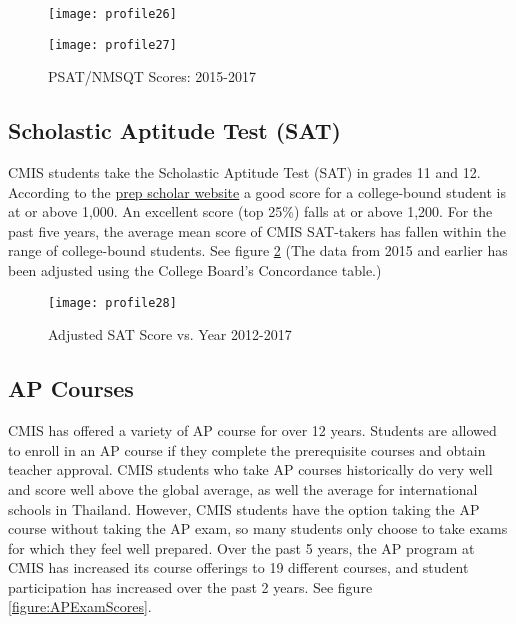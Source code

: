 \begin{figure}[H]
\caption{PSAT/NMSQT Scores: 2015-2017}
\label{figure:PSAT/NMSQTscores}
\begin{minipage}{0.5\textwidth}
\texttt{[image: profile26]}
\end{minipage}%
\begin{minipage}{0.5\textwidth}
\texttt{[image: profile27]}
\end{minipage}
\end{figure}

\subsection{Scholastic Aptitude Test (SAT)}

CMIS students take the Scholastic Aptitude Test (SAT) in grades 11 and 12.  According to the \href{https://www.prepscholar.com/sat/s/}{prep scholar website} a good score for a college-bound student is at or above 1,000.  An excellent score (top 25\%) falls at or above 1,200.  For the past five years, the average mean score of CMIS SAT-takers has fallen within the range of college-bound students. See figure \ref{figure:SATscores}  (The data from 2015 and earlier has been adjusted using the College Board’s Concordance table.)

\begin{figure}[H]
\centering
\caption{Adjusted SAT Score vs. Year 2012-2017}
\label{figure:SATscores}
\texttt{[image: profile28]}
\end{figure}

\subsection{AP Courses}

CMIS has offered a variety of AP course for over 12 years. Students are allowed to enroll in an AP course if they complete the prerequisite courses and obtain teacher approval.  CMIS students who take AP courses historically do very well and score well above the global average, as well the average for international schools in Thailand.  However, CMIS students have the option taking the AP course without taking the AP exam, so many students only choose to take exams for which they feel well prepared.  Over the past 5 years, the AP program at CMIS has increased its course offerings to 19 different courses, and student participation has increased over the past 2 years. See figure \ref{figure:APExamScores}.

